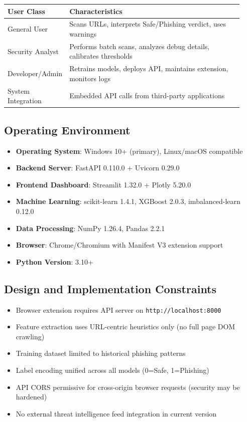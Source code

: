 \documentclass[12pt,a4paper]{report}
\begin{document}
\begin{longtable}{p{0.18\linewidth}p{0.75\linewidth}}
\toprule
\textbf{User Class} & \textbf{Characteristics} \\
\midrule
General User & Scans URLs, interprets Safe/Phishing verdict, uses warnings \\
Security Analyst & Performs batch scans, analyzes debug details, calibrates thresholds \\
Developer/Admin & Retrains models, deploys API, maintains extension, monitors logs \\
System Integration & Embedded API calls from third-party applications \\
\bottomrule
\end{longtable}

\subsection{Operating Environment}
\begin{itemize}[leftmargin=*]
    \item \textbf{Operating System}: Windows 10+ (primary), Linux/macOS compatible
    \item \textbf{Backend Server}: FastAPI 0.110.0 + Uvicorn 0.29.0
    \item \textbf{Frontend Dashboard}: Streamlit 1.32.0 + Plotly 5.20.0
    \item \textbf{Machine Learning}: scikit-learn 1.4.1, XGBoost 2.0.3, imbalanced-learn 0.12.0
    \item \textbf{Data Processing}: NumPy 1.26.4, Pandas 2.2.1
    \item \textbf{Browser}: Chrome/Chromium with Manifest V3 extension support
    \item \textbf{Python Version}: 3.10+
\end{itemize}

\subsection{Design and Implementation Constraints}
\begin{itemize}[leftmargin=*]
    \item Browser extension requires API server on \texttt{http://localhost:8000}
    \item Feature extraction uses URL-centric heuristics only (no full page DOM crawling)
    \item Training dataset limited to historical phishing patterns
    \item Label encoding unified across all models (0=Safe, 1=Phishing)
    \item API CORS permissive for cross-origin browser requests (security may be hardened)
    \item No external threat intelligence feed integration in current version
\end{itemize}
\end{document}
